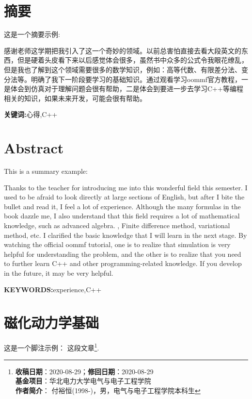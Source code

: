 
	\chapter*{摘\qquad 要}
	
	这是一个摘要示例:
	
	感谢老师这学期把我引入了这一个奇妙的领域。以前总害怕直接去看大段英文的东西，但是硬着头皮看下来以后感觉体会很多，虽然书中众多的公式令我眼花缭乱，但是我也了解到这个领域需要很多的数学知识，例如：高等代数、有限差分法、变分法等。明确了我下一阶段要学习的基础知识。通过观看学习oommf官方教程，一是体会到仿真对于理解问题会很有帮助，二是体会到要进一步去学习C++等编程相关的知识，如果未来开发，可能会很有帮助。
	
	\begin{flushleft}
		\textbf{关键词:}心得,C++    %
	\end{flushleft}
	
	\chapter*{Abstract}
	
	This is a summary example:
	
	Thanks to the teacher for introducing me into this wonderful field this semester. I used to be afraid to look directly at large sections of English, but after I bite the bullet and read it, I feel a lot of experience. Although the many formulas in the book dazzle me, I also understand that this field requires a lot of mathematical knowledge, such as advanced algebra. 
	, Finite difference method, variational method, etc. 
	I clarified the basic knowledge that I will learn in the next stage. By watching the official oommf tutorial, one is to realize that simulation is very helpful for understanding the problem, and the other is to realize that you need to further learn C++ and other programming-related knowledge. If you develop in the future, it may be very helpful.
	
	\begin{flushleft}
		\textbf{KEYWORDS:}experience,C++
	\end{flushleft}


	\chapter{磁化动力学基础}
	这是一个脚注示例：
	这段文章\footnote{\noindent \textbf{收稿日期}：2020-08-29；\textbf{修回日期}：2020-08-29\\ 
	\textbf{基金项目}：华北电力大学电气与电子工程学院\\ \textbf{作者简介}：
	付裕恒(1998-)，男，电气与电子工程学院本科生}.
